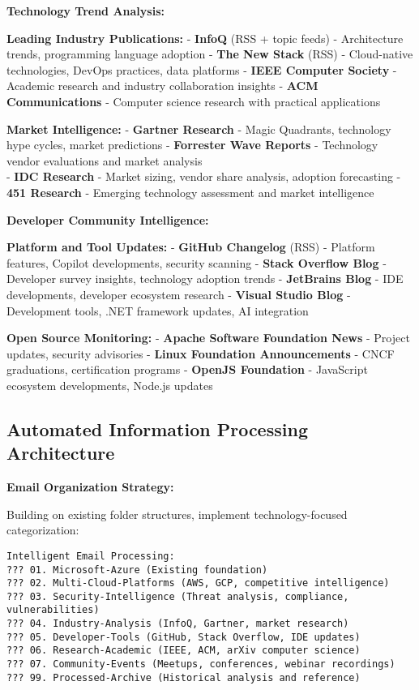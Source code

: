 \documentclass[
  letterpaper,
  DIV=11,
  numbers=noendperiod]{scrartcl}
\begin{document}
\textbf{Technology Trend Analysis:}

\textbf{Leading Industry Publications:} - \textbf{InfoQ} (RSS + topic
feeds) - Architecture trends, programming language adoption -
\textbf{The New Stack} (RSS) - Cloud-native technologies, DevOps
practices, data platforms - \textbf{IEEE Computer Society} - Academic
research and industry collaboration insights - \textbf{ACM
Communications} - Computer science research with practical applications

\textbf{Market Intelligence:} - \textbf{Gartner Research} - Magic
Quadrants, technology hype cycles, market predictions -
\textbf{Forrester Wave Reports} - Technology vendor evaluations and
market analysis\\
- \textbf{IDC Research} - Market sizing, vendor share analysis, adoption
forecasting - \textbf{451 Research} - Emerging technology assessment and
market intelligence

\textbf{Developer Community Intelligence:}

\textbf{Platform and Tool Updates:} - \textbf{GitHub Changelog} (RSS) -
Platform features, Copilot developments, security scanning -
\textbf{Stack Overflow Blog} - Developer survey insights, technology
adoption trends - \textbf{JetBrains Blog} - IDE developments, developer
ecosystem research - \textbf{Visual Studio Blog} - Development tools,
.NET framework updates, AI integration

\textbf{Open Source Monitoring:} - \textbf{Apache Software Foundation
News} - Project updates, security advisories - \textbf{Linux Foundation
Announcements} - CNCF graduations, certification programs -
\textbf{OpenJS Foundation} - JavaScript ecosystem developments, Node.js
updates

\subsection{Automated Information Processing
Architecture}\label{automated-information-processing-architecture}

\textbf{Email Organization Strategy:}

Building on existing folder structures, implement technology-focused
categorization:

\begin{verbatim}
Intelligent Email Processing:
??? 01. Microsoft-Azure (Existing foundation)
??? 02. Multi-Cloud-Platforms (AWS, GCP, competitive intelligence)
??? 03. Security-Intelligence (Threat analysis, compliance, vulnerabilities)
??? 04. Industry-Analysis (InfoQ, Gartner, market research)
??? 05. Developer-Tools (GitHub, Stack Overflow, IDE updates)
??? 06. Research-Academic (IEEE, ACM, arXiv computer science)
??? 07. Community-Events (Meetups, conferences, webinar recordings)
??? 99. Processed-Archive (Historical analysis and reference)
\end{verbatim}
\end{document}
